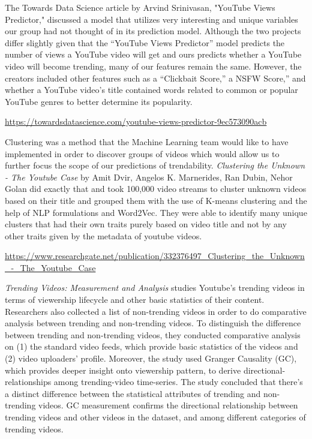 \documentclass{article}
\begin{document}
\quad The Towards Data Science article by Arvind Srinivasan, "YouTube Views Predictor," discussed a model that utilizes very interesting and unique variables our group had not thought of in its prediction model. Although the two projects differ slightly given that the “YouTube Views Predictor” model predicts the number of views a YouTube video will get and ours predicts whether a YouTube video will become trending, many of our features remain the same. However, the creators included other features such as a “Clickbait Score,” a NSFW Score,” and whether a YouTube video’s title contained words related to common or popular YouTube genres to better determine its popularity. \smallskip

\href{https://towardsdatascience.com/youtube-views-predictor-9ec573090acb}{https://towardsdatascience.com/youtube-views-predictor-9ec573090acb} \bigskip

\par Clustering was a method that the Machine Learning team would like to have implemented in order to discover groups of videos which would allow us to further focus the scope of our predictions of trendability. \textit{Clustering the Unknown - The Youtube Case} by Amit Dvir, Angelos K. Marnerides, Ran Dubin, Nehor Golan did exactly that and took 100,000 video streams to cluster unknown videos based on their title and grouped them with the use of K-means clustering and the help of NLP formulations and Word2Vec. They were able to identify many unique clusters that had their own traits purely based on video title and not by any other traits given by the metadata of youtube videos. \smallskip

\href{https://www.researchgate.net/publication/332376497_Clustering_the_Unknown_-_The_Youtube_Case}{https://www.researchgate.net/publication/332376497\_Clustering\_the\_Unknown\_-\_The\_Youtube\_Case} \bigskip


\textit{Trending Videos: Measurement and Analysis} studies Youtube’s trending videos in terms of viewership lifecycle and other basic statistics of their content. Researchers also collected a list of non-trending videos in order to do comparative analysis between trending and non-trending videos. To distinguish the difference between trending and non-trending videos, they conducted comparative analysis on (1) the standard video feeds, which provide basic statistics of the videos and (2) video uploaders’ profile. Moreover, the study used Granger Causality (GC), which provides deeper insight onto viewership pattern, to derive directional-relationships among trending-video time-series. The study concluded that there’s a distinct difference between the statistical attributes of trending and non-trending videos. GC measurement confirms the directional relationship between trending videos and other videos in the dataset, and among different categories of trending videos. \smallskip
\end{document}

